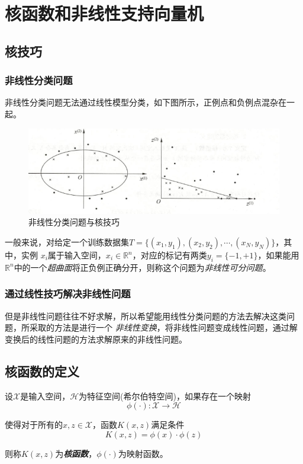 \chapter{核函数和非线性支持向量机}

\section{核技巧}

\subsection*{非线性分类问题}

非线性分类问题无法通过线性模型分类，如下图所示，正例点和负例点混杂在一起。

\begin{figure}[H]
    \centering
    \includegraphics[scale=0.5]{figures/非线性分类问题和核技巧.png}
    \caption{非线性分类问题与核技巧}
    \label{非线性分类问题与核技巧}
\end{figure}

一般来说，对给定一个训练数据集$T=\{(x_1,y_1),(x_2,y_2),\cdots,(x_N,y_N)\}$，其中，实例
$x_i$属于输入空间，$x_i\in \mathbb{R}^n$，对应的标记有两类$y_i=\{-1,+1\}$，如果能用
$\mathbb{R}^n$中的一个\textsl{超曲面}将正负例正确分开，则称这个问题为\textsl{非线性可分问题}。

\subsection*{通过线性技巧解决非线性问题}
但是非线性问题往往不好求解，所以希望能用线性分类问题的方法去解决这类问题，所采取的方法是进行一个
\textsl{非线性变换}，将非线性问题变成线性问题，通过解变换后的线性问题的方法求解原来的非线性问题。


\section{核函数的定义}
\begin{define}
    设$\mathcal{X}$是输入空间，$\mathcal{H}$为特征空间(希尔伯特空间)，如果存在一个映射
    \begin{equation}
        \phi(\cdot):\mathcal{X}\rightarrow \mathcal{H}
    \end{equation}

    使得对于所有的$x,z\in \mathcal{X}$，函数$K(x,z)$满足条件
    \begin{equation}
        K(x,z)=\phi(x)\cdot \phi(z)
    \end{equation}

    则称$K(x,z)$为\textsl{\textbf{核函数}}，$\phi(\cdot)$为映射函数。
\end{define}

